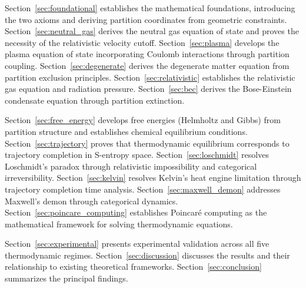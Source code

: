 Section~\ref{sec:foundational} establishes the mathematical foundations, introducing the two axioms and deriving partition coordinates from geometric constraints. Section~\ref{sec:neutral_gas} derives the neutral gas equation of state and proves the necessity of the relativistic velocity cutoff. Section~\ref{sec:plasma} develops the plasma equation of state incorporating Coulomb interactions through partition coupling. Section~\ref{sec:degenerate} derives the degenerate matter equation from partition exclusion principles. Section~\ref{sec:relativistic} establishes the relativistic gas equation and radiation pressure. Section~\ref{sec:bec} derives the Bose-Einstein condensate equation through partition extinction.

Section~\ref{sec:free_energy} develops free energies (Helmholtz and Gibbs) from partition structure and establishes chemical equilibrium conditions. Section~\ref{sec:trajectory} proves that thermodynamic equilibrium corresponds to trajectory completion in S-entropy space. Section~\ref{sec:loschmidt} resolves Loschmidt's paradox through relativistic impossibility and categorical irreversibility. Section~\ref{sec:kelvin} resolves Kelvin's heat engine limitation through trajectory completion time analysis. Section~\ref{sec:maxwell_demon} addresses Maxwell's demon through categorical dynamics. Section~\ref{sec:poincare_computing} establishes Poincaré computing as the mathematical framework for solving thermodynamic equations.

Section~\ref{sec:experimental} presents experimental validation across all five thermodynamic regimes. Section~\ref{sec:discussion} discusses the results and their relationship to existing theoretical frameworks. Section~\ref{sec:conclusion} summarizes the principal findings.

